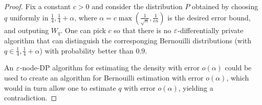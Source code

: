\begin{proof}
 Fix a constant $c>0$ and consider the distribution $P$ obtained by choosing $q$ uniformly in
 ${\frac 1 4, \frac 14 +\alpha}$, where $\alpha = c\max (\frac{1}{\sqrt{n}},
  \frac 1 {\epsilon n})$ is the desired error bound, and outputing
  $W_q$. One can pick $c$ so that there is no $\varepsilon$-differentially private
  algorithm that can distinguish the corresponging Bernouilli
  distributions (with $q \in {\frac 1 4, \frac 14 +\alpha}$) with
  probability better than $0.9$.

  An $\varepsilon$-node-DP algorithm for estimating the density with error
  $o(\alpha)$ could be used to create an algorithm for Bernouilli
  estimation with error $o(\alpha)$, which would in turn allow one to
  estimate $q$ with error $o(\alpha)$, yielding a contradiction.
\end{proof}









